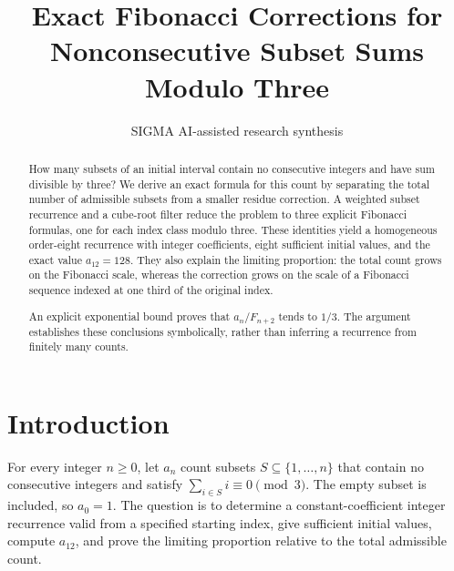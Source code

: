 \documentclass[11pt]{article}
\title{Exact Fibonacci Corrections for Nonconsecutive Subset Sums Modulo Three}
\date{}
\author{SIGMA AI-assisted research synthesis}
\begin{document}
\maketitle

\begin{abstract}
How many subsets of an initial interval contain no consecutive integers and have sum divisible by three? We derive an exact formula for this count by separating the total number of admissible subsets from a smaller residue correction. A weighted subset recurrence and a cube-root filter reduce the problem to three explicit Fibonacci formulas, one for each index class modulo three. These identities yield a homogeneous order-eight recurrence with integer coefficients, eight sufficient initial values, and the exact value $a_{12}=128$. They also explain the limiting proportion: the total count grows on the Fibonacci scale, whereas the correction grows on the scale of a Fibonacci sequence indexed at one third of the original index.

An explicit exponential bound proves that $a_n/F_{n+2}$ tends to $1/3$. The argument establishes these conclusions symbolically, rather than inferring a recurrence from finitely many counts.
\end{abstract}
\begingroup\setlength{\fboxsep}{10pt}
\noindent{}\endgroup\par\medskip
\section{Introduction}
For every integer $n\geq 0$, let $a_n$ count subsets $S\subseteq\{1,\ldots,n\}$ that contain no consecutive integers and satisfy $\sum_{i\in S}i\equiv 0\pmod 3$. The empty subset is included, so $a_0=1$. The question is to determine a constant-coefficient integer recurrence valid from a specified starting index, give sufficient initial values, compute $a_{12}$, and prove the limiting proportion relative to the total admissible count.
\end{document}
